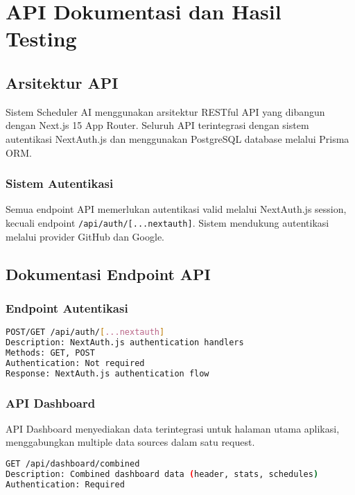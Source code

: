 \section{API Dokumentasi dan Hasil Testing}

\subsection{Arsitektur API}

Sistem Scheduler AI menggunakan arsitektur RESTful API yang dibangun dengan Next.js 15 App Router. Seluruh API terintegrasi dengan sistem autentikasi NextAuth.js dan menggunakan PostgreSQL database melalui Prisma ORM.

\subsubsection{Sistem Autentikasi}
Semua endpoint API memerlukan autentikasi valid melalui NextAuth.js session, kecuali endpoint \texttt{/api/auth/[...nextauth]}. Sistem mendukung autentikasi melalui provider GitHub dan Google.

\subsection{Dokumentasi Endpoint API}

\subsubsection{Endpoint Autentikasi}

\begin{lstlisting}[language=bash, caption=Authentication Endpoint]
POST/GET /api/auth/[...nextauth]
Description: NextAuth.js authentication handlers
Methods: GET, POST
Authentication: Not required
Response: NextAuth.js authentication flow
\end{lstlisting}

\subsubsection{API Dashboard}

API Dashboard menyediakan data terintegrasi untuk halaman utama aplikasi, menggabungkan multiple data sources dalam satu request.

\begin{lstlisting}[language=bash, caption=Combined Dashboard Data]
GET /api/dashboard/combined
Description: Combined dashboard data (header, stats, schedules)
Authentication: Required
\end{lstlisting}

